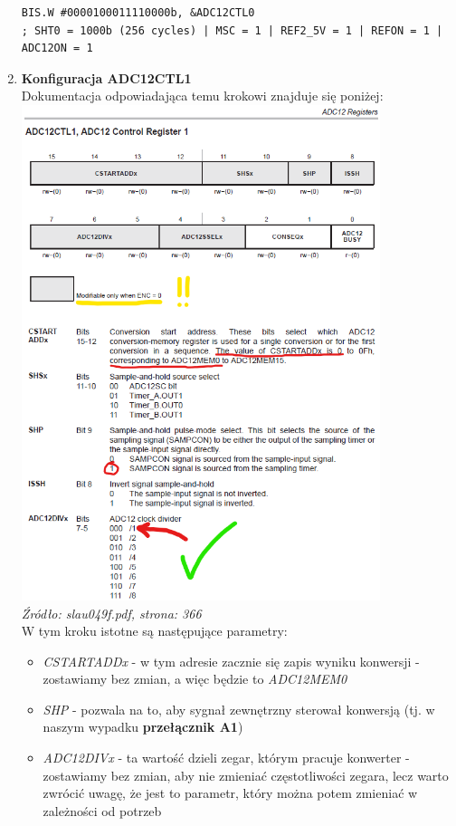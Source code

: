 \documentclass{article}
\begin{document}
\begin{enumerate}[label=\arabic*.]
\begin{verbatim}
BIS.W #0000100011110000b, &ADC12CTL0
; SHT0 = 1000b (256 cycles) | MSC = 1 | REF2_5V = 1 | REFON = 1 | ADC12ON = 1 \end{verbatim}
    \item \textbf{Konfiguracja ADC12CTL1}
    \vspace{3mm} \\
Dokumentacja odpowiadająca temu krokowi znajduje się poniżej: \\
\includegraphics[width=0.825\textwidth]{"../adc_img/slau049f_366.png"} \\
\textit{Źródło: slau049f.pdf, strona: 366}
\vspace{3mm} \\
W tym kroku istotne są następujące parametry:
\begin{itemize}
     \item \textit{CSTARTADDx} - w tym adresie zacznie się zapis wyniku konwersji - zostawiamy bez zmian, a więc będzie to \textit{ADC12MEM0}
     \item \textit{SHP} - pozwala na to, aby sygnał zewnętrzny sterował konwersją (tj. w naszym wypadku \textbf{przełącznik A1})
     \item \textit{ADC12DIVx} - ta wartość dzieli zegar, którym pracuje konwerter - zostawiamy bez zmian, aby nie zmieniać częstotliwości zegara, lecz warto zwrócić uwagę, że jest to parametr, który można potem zmieniać w zależności od potrzeb

\end{itemize}
\end{enumerate}
\end{document}
